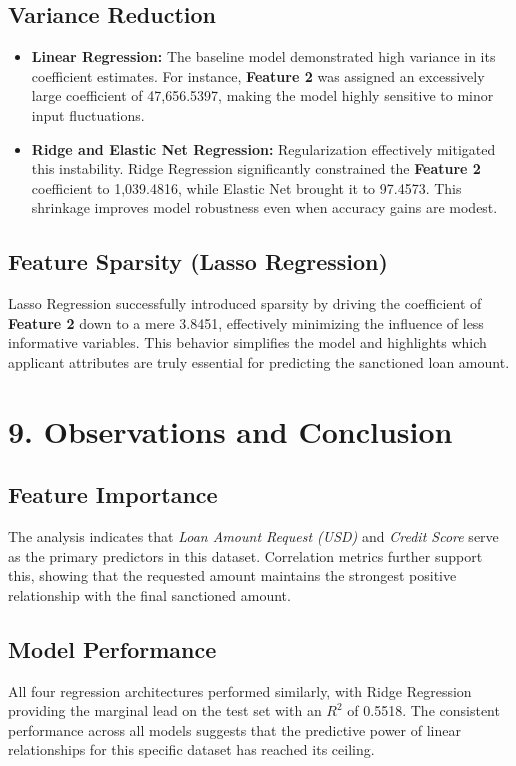 \documentclass[11pt]{article}
\begin{document}
\subsection*{Variance Reduction} \begin{itemize} \item \textbf{Linear Regression:} The baseline model demonstrated high variance in its coefficient estimates. For instance, \textbf{Feature 2} was assigned an excessively large coefficient of 47,656.5397, making the model highly sensitive to minor input fluctuations. \item \textbf{Ridge and Elastic Net Regression:} Regularization effectively mitigated this instability. Ridge Regression significantly constrained the \textbf{Feature 2} coefficient to 1,039.4816, while Elastic Net brought it to 97.4573. This shrinkage improves model robustness even when accuracy gains are modest. \end{itemize}

\subsection*{Feature Sparsity (Lasso Regression)} Lasso Regression successfully introduced sparsity by driving the coefficient of \textbf{Feature 2} down to a mere 3.8451, effectively minimizing the influence of less informative variables. This behavior simplifies the model and highlights which applicant attributes are truly essential for predicting the sanctioned loan amount.

\section*{9. Observations and Conclusion}

\subsection*{Feature Importance} The analysis indicates that \textit{Loan Amount Request (USD)} and \textit{Credit Score} serve as the primary predictors in this dataset. Correlation metrics further support this, showing that the requested amount maintains the strongest positive relationship with the final sanctioned amount.

\subsection*{Model Performance} All four regression architectures performed similarly, with Ridge Regression providing the marginal lead on the test set with an $R^2$ of 0.5518. The consistent performance across all models suggests that the predictive power of linear relationships for this specific dataset has reached its ceiling.
\end{document}
